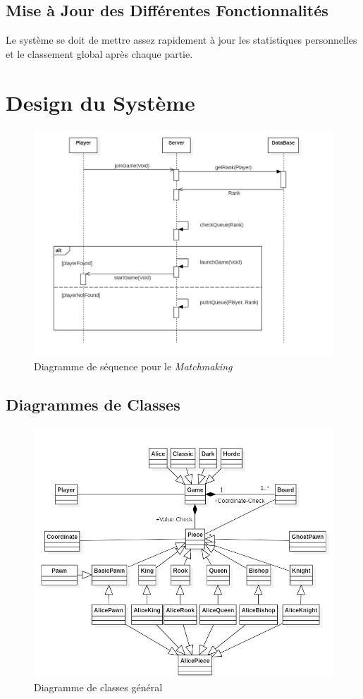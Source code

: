 \documentclass[10pt, a4paper]{article}
\begin{document}
\subsection{Mise à Jour des Différentes Fonctionnalités}
Le système se doit de mettre assez rapidement à jour les statistiques personnelles et le classement global après chaque partie.

\section{Design du Système}

\begin{figure}[H]
\centering
\includegraphics[scale=0.72]{SequenceDiagramMatchmaking.png}
\caption{Diagramme de séquence pour le \textit{Matchmaking}}
\label{SD_matchmaker} %
\end{figure}

\subsection{Diagrammes de Classes}
\begin{figure}[H]
\centering
\includegraphics[scale=0.5]{ClassDiagram.png}
\caption{Diagramme de classes général}
\label{CD} %
\end{figure}
\end{document}
